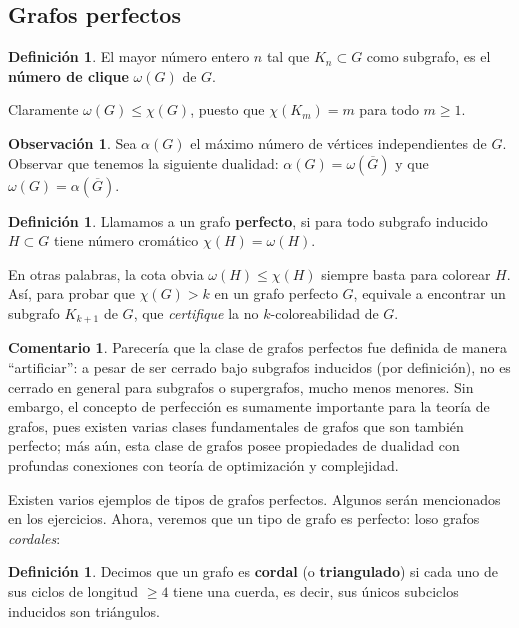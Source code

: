 \documentclass[12pt]{report}
\theoremstyle{plain}
\theoremstyle{definition}
\newtheorem{definition}[theorem]{Definición}
\newtheorem{obs}[theorem]{Observación}
\newtheorem{remark}[theorem]{Comentario}
\renewcommand{\bar}[1]{\overline{#1}}
\begin{document}
\subsection{Grafos perfectos}

\begin{definition}
El mayor número entero $n$ tal que $K_n \subset G$ como subgrafo, es el \textbf{número de clique} $\omega (G)$ de $G$.
\end{definition}
Claramente $\omega (G) \leq \chi (G)$, puesto que $\chi (K_m) = m$ para todo $m \geq 1$.

\begin{obs}
Sea $\alpha (G)$ el máximo número de vértices independientes de $G$. Observar que tenemos la siguiente dualidad: $\alpha (G) = \omega (\bar G)$ y que $\omega (G) = \alpha (\bar G)$.
\end{obs}

\begin{definition}
Llamamos a un grafo \textbf{perfecto}, si para todo subgrafo inducido $H \subset G$ tiene número cromático $\chi (H) = \omega (H)$.
\end{definition}
En otras palabras, la cota obvia $\omega (H) \leq \chi (H)$ siempre basta para colorear $H$. Así, para probar que $\chi (G) > k$ en un grafo perfecto $G$, equivale a encontrar un subgrafo $K_{k+1}$ de $G$, que \textit{certifique} la no $k$-coloreabilidad de $G$.

\begin{remark}
Parecería que la clase de grafos perfectos fue definida de manera ``artificiar'': a pesar de ser cerrado bajo subgrafos inducidos (por definición), no es cerrado en general para subgrafos o supergrafos, mucho menos menores. Sin embargo, el concepto de perfección es sumamente importante para la teoría de grafos, pues existen varias clases fundamentales de grafos que son también perfecto; más aún, esta clase de grafos posee propiedades de dualidad con profundas conexiones con teoría de optimización y complejidad.
\end{remark}

\bigskip

Existen varios ejemplos de tipos de grafos perfectos. Algunos serán mencionados en los ejercicios. Ahora, veremos que un tipo de grafo es perfecto: loso grafos \textit{cordales}:

\begin{definition}
Decimos que un grafo es \textbf{cordal} (o \textbf{triangulado}) si cada uno de sus ciclos de longitud $\geq 4$ tiene una cuerda, es decir, sus únicos subciclos inducidos son triángulos.
\end{definition}
\end{document}
